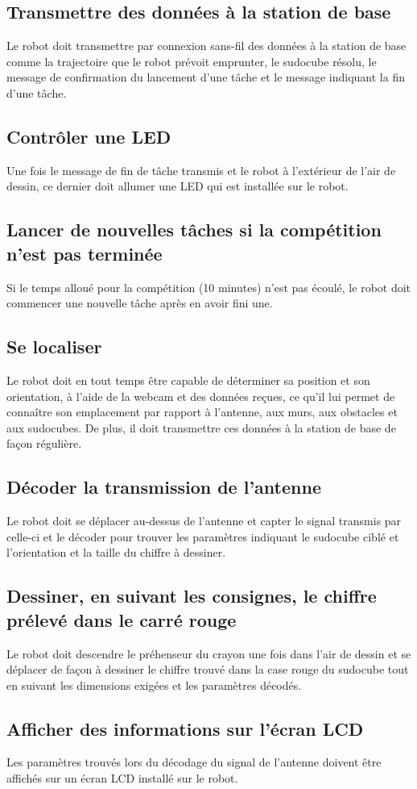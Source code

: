 \subsection{Transmettre des données à la station de base}
Le robot doit transmettre par connexion sans-fil des données à la station de base comme la trajectoire que le robot prévoit emprunter, le sudocube résolu, le message de confirmation du lancement d'une tâche et le message indiquant la fin d'une tâche.
\subsection{Contrôler une LED}
Une fois le message de fin de tâche transmis et le robot à l'extérieur de l'air de dessin, ce dernier doit allumer une LED qui est installée sur le robot.
\subsection{Lancer de nouvelles tâches si la compétition n'est pas terminée}
Si le temps alloué pour la compétition (10 minutes) n'est pas écoulé, le robot doit commencer une nouvelle tâche après en avoir fini une.
\subsection{Se localiser}
Le robot doit en tout temps être capable de déterminer sa position et son orientation, à l'aide de la webcam et des données reçues, ce qu'il lui permet de connaître son emplacement par rapport à l'antenne, aux murs, aux obstacles et aux sudocubes. De plus, il doit transmettre ces données à la station de base de façon régulière.
\subsection{Décoder la transmission de l'antenne}
Le robot doit se déplacer au-dessus de l'antenne et capter le signal transmis par celle-ci et le décoder pour trouver les paramètres indiquant le sudocube ciblé et l'orientation et la taille du chiffre à dessiner.
\subsection{Dessiner, en suivant les consignes, le chiffre prélevé dans le carré rouge}
Le robot doit descendre le préhenseur du crayon une fois dans l'air de dessin et se déplacer de façon à dessiner le chiffre trouvé dans la case rouge du sudocube tout en suivant les dimensions exigées et les paramètres décodés. 
\subsection{Afficher des informations sur l'écran LCD}
Les paramètres trouvés lors du décodage du signal de l'antenne doivent être affichés sur un écran LCD installé sur le robot.
